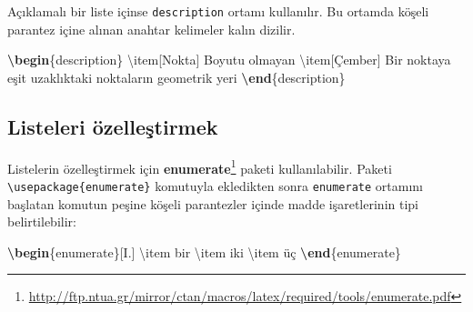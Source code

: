 \documentclass[
  10pt,
]{scrbook}
\newenvironment{Shaded}{\begin{snugshade}}{\end{snugshade}}
\newcommand{\ExtensionTok}[1]{#1}
\newcommand{\FunctionTok}[1]{\textcolor[rgb]{0.00,0.00,0.00}{#1}}
\newcommand{\KeywordTok}[1]{\textcolor[rgb]{0.13,0.29,0.53}{\textbf{#1}}}
\newcommand{\NormalTok}[1]{#1}
\newcommand{\SpecialCharTok}[1]{\textcolor[rgb]{0.00,0.00,0.00}{#1}}
\newcommand{\SpecialStringTok}[1]{\textcolor[rgb]{0.31,0.60,0.02}{#1}}
\renewcommand{\href}[2]{#2\footnote{\url{#1}}}
\theoremstyle{definition}
\theoremstyle{definition}
\theoremstyle{definition}
\theoremstyle{definition}
\theoremstyle{remark}
\begin{document}
\begin{Shaded}
\end{Shaded}

Açıklamalı bir liste içinse \texttt{description} ortamı kullanılır. Bu ortamda köşeli parantez içine alınan anahtar kelimeler kalın dizilir.

\begin{Shaded}
\begin{Highlighting}[]
\KeywordTok{\textbackslash{}begin}\NormalTok{\{}\ExtensionTok{description}\NormalTok{\}}
  \FunctionTok{\textbackslash{}item}\NormalTok{[Nokta] Boyutu olmayan}
  \FunctionTok{\textbackslash{}item}\NormalTok{[Çember] Bir noktaya eşit}
\NormalTok{  uzaklıktaki noktaların geometrik yeri}
\KeywordTok{\textbackslash{}end}\NormalTok{\{}\ExtensionTok{description}\NormalTok{\}}
\end{Highlighting}
\end{Shaded}

\hypertarget{listeleri-uxf6zelleux15ftirmek}{%
\subsection{Listeleri özelleştirmek}\label{listeleri-uxf6zelleux15ftirmek}}

Listelerin özelleştirmek için \href{http://ftp.ntua.gr/mirror/ctan/macros/latex/required/tools/enumerate.pdf}{\textbf{enumerate}} paketi kullanılabilir. Paketi \texttt{\textbackslash{}usepackage\{enumerate\}} komutuyla ekledikten sonra \texttt{enumerate} ortamını başlatan komutun peşine köşeli parantezler içinde madde işaretlerinin tipi belirtilebilir:

\begin{Shaded}
\begin{Highlighting}[]
\KeywordTok{\textbackslash{}begin}\NormalTok{\{}\ExtensionTok{enumerate}\NormalTok{\}[I.]}
 \FunctionTok{\textbackslash{}item}\NormalTok{ bir}
 \FunctionTok{\textbackslash{}item}\NormalTok{ iki }
 \FunctionTok{\textbackslash{}item}\NormalTok{ üç}
\KeywordTok{\textbackslash{}end}\NormalTok{\{}\ExtensionTok{enumerate}\NormalTok{\}}
\end{Highlighting}
\end{Shaded}
\end{document}
